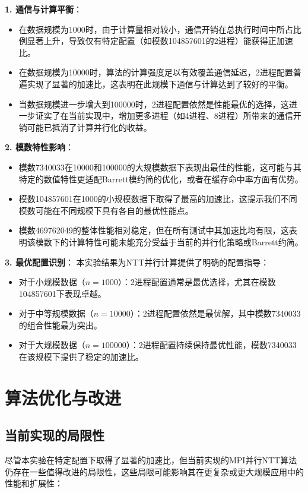 \documentclass[a4paper]{article}
\begin{document}
\textbf{1. 通信与计算平衡}：
\begin{itemize}
  \item 在数据规模为1000时，由于计算量相对较小，通信开销在总执行时间中所占比例显著上升，导致仅有特定配置（如模数104857601的2进程）能获得正加速比。
  \item 在数据规模为10000时，算法的计算强度足以有效覆盖通信延迟，2进程配置普遍实现了显著的加速比，这表明在此规模下通信与计算达到了较好的平衡。
  \item 当数据规模进一步增大到100000时，2进程配置依然是性能最优的选择，这进一步证实了在当前实现中，增加更多进程（如4进程、8进程）所带来的通信开销可能已抵消了计算并行化的收益。
\end{itemize}

\textbf{2. 模数特性影响}：
\begin{itemize}
  \item 模数7340033在10000和100000的大规模数据下表现出最佳的性能，这可能与其特定的数值特性更适配Barrett模约简的优化，或者在缓存命中率方面有优势。
  \item 模数104857601在1000的小规模数据下取得了最高的加速比，这提示我们不同模数可能在不同规模下具有各自的最优性能点。
  \item 模数469762049的整体性能相对稳定，但在所有测试中其加速比均有限，这表明该模数下的计算特性可能未能充分受益于当前的并行化策略或Barrett约简。
\end{itemize}

\textbf{3. 最优配置识别}：
本实验结果为NTT并行计算提供了明确的配置指导：
\begin{itemize}
  \item 对于小规模数据（$n=1000$）：2进程配置通常是最优选择，尤其在模数104857601下表现卓越。
  \item 对于中等规模数据（$n=10000$）：2进程配置依然是最优解，其中模数7340033的组合性能最为突出。
  \item 对于大规模数据（$n=100000$）：2进程配置持续保持最优性能，模数7340033在该规模下提供了稳定的加速比。
\end{itemize}

\section{算法优化与改进}

\subsection{当前实现的局限性}

尽管本实验在特定配置下取得了显著的加速比，但当前实现的MPI并行NTT算法仍存在一些值得改进的局限性，这些局限可能影响其在更复杂或更大规模应用中的性能和扩展性：
\end{document}
